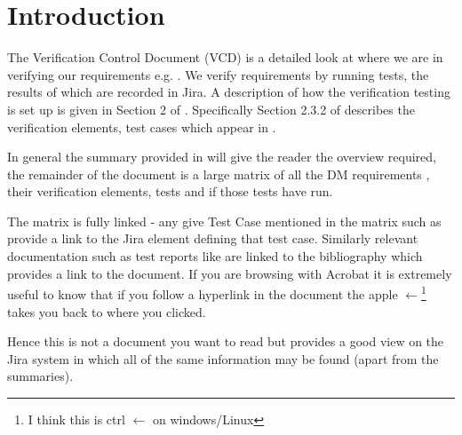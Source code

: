 
\section{Introduction}
\label{sec:intro}

The \gls{Verification} Control \gls{Document} (\gls{VCD}) is a detailed look at where we are in verifying our requirements e.g. .
We verify requirements by
running tests, the results of which are recorded in Jira.  A description of how the verification testing is set up is given in Section 2 of .
Specifically Section 2.3.2 of  describes the verification elements, test cases which appear in .

In general the summary provided in  will give the reader the overview required, the remainder of the document is a large matrix of all the \gls{DM} requirements , their verification elements, tests and if those tests have run.

The matrix is fully linked - any give Test Case mentioned in the matrix such as  provide a link to the Jira element defining that test case. Similarly relevant documentation such as test reports like  are linked to the bibliography which provides a link to the document.
If you are browsing with Acrobat it is extremely useful to know that if you follow a hyperlink in the document the  apple $\leftarrow$\footnote{I think this is ctrl $\leftarrow$ on windows/Linux} takes you back to where you clicked.

Hence this is not a document you want to read but provides a good view on the Jira system in which all of the same information may be found (apart from the summaries).
